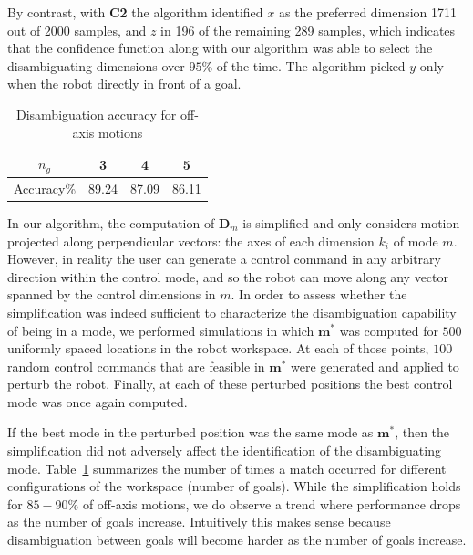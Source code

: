 \documentclass[conference]{IEEEtran}
\begin{document}
By contrast, with \textbf{C2} the algorithm identified $x$ as the preferred dimension 1711 out of 2000 samples, and $z$ in 196 of the remaining 289 samples, which indicates that the confidence function along with our algorithm was able to select the disambiguating dimensions over $95\%$ of the time. The algorithm picked $y$ only when the robot directly in front of a goal. 
\begin{table}[h]
	\centering
	\begin{tabular}{|c|c|c|c|}
		\hline
		$n_g$ & 3 & 4 & 5 \\
		\hline
		Accuracy\% & 89.24 & 87.09 & 86.11 \\
		\hline
	\end{tabular}
	\vspace{.2cm}
	\caption{Disambiguation accuracy for off-axis motions} 
	\label{SIM}
	\vspace{-.5cm}
\end{table}

 In our algorithm, the computation of $\boldsymbol{D}_{m}$ is simplified and only considers motion projected along perpendicular vectors: the axes of each dimension $k_i$ of mode $m$. However, in reality the user can generate a control command in any arbitrary direction within the control mode, and so the robot can move along any vector spanned by the control dimensions in $m$. In order to assess whether the simplification was indeed sufficient to characterize the disambiguation capability of being in a mode, we performed simulations in which $\boldsymbol{m}^*$ was computed for $500$ uniformly spaced locations in the robot workspace. At each of those points, $100$ random control commands that are feasible in $\boldsymbol{m}^*$ were generated and applied to perturb the robot. Finally, at each of these perturbed positions the best control mode was once again computed. 

If the best mode in the perturbed position was the same mode as $\boldsymbol{m}^*$, then the simplification did not adversely affect the identification of the disambiguating mode. Table~\ref{SIM} summarizes the number of times a match occurred for different configurations of the workspace (number of goals). While the simplification holds for $85-90\%$ of off-axis motions, we do observe a trend where performance drops as the number of goals increase. Intuitively this makes sense because disambiguation between goals will become harder as the number of goals increase. 
 
\end{document}
